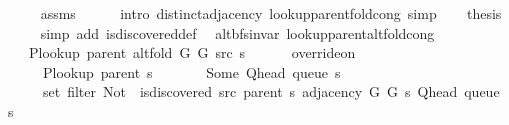 \begin{isabellebody}
\ \ \ \ \isamarkupfalse%
\ assms\isanewline
\ \ \ \ \isamarkupfalse%
\ {\isacharparenleft}{\kern0pt}intro\ distinct{\isacharunderscore}{\kern0pt}adjacency\ lookup{\isacharunderscore}{\kern0pt}parent{\isacharunderscore}{\kern0pt}fold{\isacharunderscore}{\kern0pt}cong{\isacharparenright}{\kern0pt}\ simp\isanewline
\ \ \isamarkupfalse%
\ {\isacharquery}{\kern0pt}thesis\isanewline
\ \ \ \ \isamarkupfalse%
\ {\isacharparenleft}{\kern0pt}simp\ add{\isacharcolon}{\kern0pt}\ is{\isacharunderscore}{\kern0pt}discovered{\isacharunderscore}{\kern0pt}def{\isacharparenright}{\kern0pt}\isanewline
{}\isamarkupfalse%
%
\endisatagproof
{\isafoldproof}%
%
\isadelimproof
\isanewline
%
\endisadelimproof
\isanewline
{}\isamarkupfalse%
\ {\isacharparenleft}{\kern0pt}\ alt{\isacharunderscore}{\kern0pt}bfs{\isacharunderscore}{\kern0pt}invar{\isacharparenright}{\kern0pt}\ lookup{\isacharunderscore}{\kern0pt}parent{\isacharunderscore}{\kern0pt}alt{\isacharunderscore}{\kern0pt}fold{\isacharunderscore}{\kern0pt}cong{\isacharcolon}{\kern0pt}\isanewline
\ \ \isanewline
\ \ \ \ {\isachardoublequoteopen}P{\isacharunderscore}{\kern0pt}lookup\ {\isacharparenleft}{\kern0pt}parent\ {\isacharparenleft}{\kern0pt}alt{\isacharunderscore}{\kern0pt}fold\ G{}\ G{}\ src\ s{\isacharparenright}{\kern0pt}{\isacharparenright}{\kern0pt}\ {\isacharequal}{\kern0pt}\isanewline
\ \ \ \ \ override{\isacharunderscore}{\kern0pt}on\isanewline
\ \ \ \ \ \ {\isacharparenleft}{\kern0pt}P{\isacharunderscore}{\kern0pt}lookup\ {\isacharparenleft}{\kern0pt}parent\ s{\isacharparenright}{\kern0pt}{\isacharparenright}{\kern0pt}\isanewline
\ \ \ \ \ \ {\isacharparenleft}{\kern0pt}{\isasymlambda}{\isacharunderscore}{\kern0pt}{\isachardot}{\kern0pt}\ Some\ {\isacharparenleft}{\kern0pt}Q{\isacharunderscore}{\kern0pt}head\ {\isacharparenleft}{\kern0pt}queue\ s{\isacharparenright}{\kern0pt}{\isacharparenright}{\kern0pt}{\isacharparenright}{\kern0pt}\isanewline
\ \ \ \ \ \ {\isacharparenleft}{\kern0pt}set\ {\isacharparenleft}{\kern0pt}filter\ {\isacharparenleft}{\kern0pt}Not\ {\isasymcirc}\ is{\isacharunderscore}{\kern0pt}discovered\ src\ {\isacharparenleft}{\kern0pt}parent\ s{\isacharparenright}{\kern0pt}{\isacharparenright}{\kern0pt}\ {\isacharparenleft}{\kern0pt}adjacency\ G{}\ G{}\ s\ {\isacharparenleft}{\kern0pt}Q{\isacharunderscore}{\kern0pt}head\ {\isacharparenleft}{\kern0pt}queue\ s{\isacharparenright}{\kern0pt}{\isacharparenright}{\kern0pt}{\isacharparenright}{\kern0pt}{\isacharparenright}{\kern0pt}{\isacharparenright}{\kern0pt}{\isachardoublequoteclose}\isanewline

\end{isabellebody}
